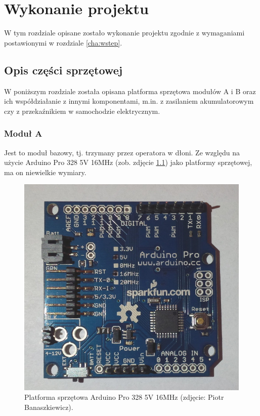 \chapter{Wykonanie projektu}
\label{cha:wykonanie_projektu}

W tym rozdziale opisane zostało wykonanie projektu zgodnie z wymaganiami postawionymi w rozdziale \ref{cha:wstep}.


\section{Opis części sprzętowej}
\label{sec:opis_cz_sprzetowej}

W poniższym rozdziale została opisana platforma sprzętowa modułów A i B oraz ich współdziałanie z innymi komponentami, m.in. z zasilaniem akumulatorowym czy z przekaźnikiem w samochodzie elektrycznym.

\subsection{Moduł A}
\label{subsec:modul_a}

Jest to moduł bazowy, tj. trzymany przez operatora w dłoni. Ze względu na użycie Arduino Pro 328 5V 16MHz \cite{Ard00} (zob. zdjęcie \ref{fig:arduino_pro}) jako platformy sprzętowej, ma on niewielkie wymiary.

\begin{figure}[h]
	\centering
	\includegraphics[scale=0.3]{pics/arduino_pro_scaled.jpg}
	\caption{\label{fig:arduino_pro}Platforma sprzętowa Arduino Pro 328 5V 16MHz (zdjęcie: Piotr Banaszkiewicz).}
\end{figure}

